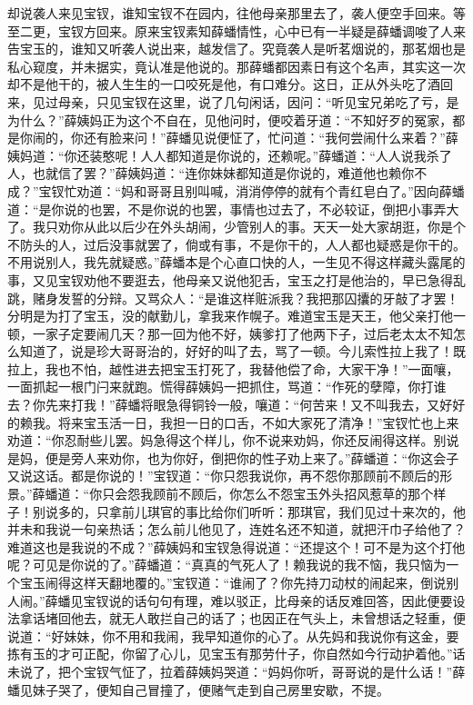 \documentclass[12pt,oneside]{book}
\begin{document}
却说袭人来见宝钗，谁知宝钗不在园内，往他母亲那里去了，袭人便空手回来。等至二更，宝钗方回来。原来宝钗素知薛蟠情性，心中已有一半疑是薛蟠调唆了人来告宝玉的，谁知又听袭人说出来，越发信了。究竟袭人是听茗烟说的，那茗烟也是私心窥度，并未据实，竟认准是他说的。那薛蟠都因素日有这个名声，其实这一次却不是他干的，被人生生的一口咬死是他，有口难分。这日，正从外头吃了酒回来，见过母亲，只见宝钗在这里，说了几句闲话，因问：“听见宝兄弟吃了亏，是为什么？”薛姨妈正为这个不自在，见他问时，便咬着牙道：“不知好歹的冤家，都是你闹的，你还有脸来问！”薛蟠见说便怔了，忙问道：“我何尝闹什么来着？”薛姨妈道：“你还装憨呢！人人都知道是你说的，还赖呢。”薛蟠道：“人人说我杀了人，也就信了罢？”薛姨妈道：“连你妹妹都知道是你说的，难道他也赖你不成？”宝钗忙劝道：“妈和哥哥且别叫喊，消消停停的就有个青红皂白了。”因向薛蟠道：“是你说的也罢，不是你说的也罢，事情也过去了，不必较证，倒把小事弄大了。我只劝你从此以后少在外头胡闹，少管别人的事。天天一处大家胡逛，你是个不防头的人，过后没事就罢了，倘或有事，不是你干的，人人都也疑惑是你干的。不用说别人，我先就疑惑。”薛蟠本是个心直口快的人，一生见不得这样藏头露尾的事，又见宝钗劝他不要逛去，他母亲又说他犯舌，宝玉之打是他治的，早已急得乱跳，赌身发誓的分辩。又骂众人：“是谁这样赃派我？我把那囚攮的牙敲了才罢！分明是为打了宝玉，没的献勤儿，拿我来作幌子。难道宝玉是天王，他父亲打他一顿，一家子定要闹几天？那一回为他不好，姨爹打了他两下子，过后老太太不知怎么知道了，说是珍大哥哥治的，好好的叫了去，骂了一顿。今儿索性拉上我了！既拉上，我也不怕，越性进去把宝玉打死了，我替他偿了命，大家干净！”一面嚷，一面抓起一根门闩来就跑。慌得薛姨妈一把抓住，骂道：“作死的孽障，你打谁去？你先来打我！”薛蟠将眼急得铜铃一般，嚷道：“何苦来！又不叫我去，又好好的赖我。将来宝玉活一日，我担一日的口舌，不如大家死了清净！”宝钗忙也上来劝道：“你忍耐些儿罢。妈急得这个样儿，你不说来劝妈，你还反闹得这样。别说是妈，便是旁人来劝你，也为你好，倒把你的性子劝上来了。”薛蟠道：“你这会子又说这话。都是你说的！”宝钗道：“你只怨我说你，再不怨你那顾前不顾后的形景。”薛蟠道：“你只会怨我顾前不顾后，你怎么不怨宝玉外头招风惹草的那个样子！别说多的，只拿前儿琪官的事比给你们听听：那琪官，我们见过十来次的，他并未和我说一句亲热话；怎么前儿他见了，连姓名还不知道，就把汗巾子给他了？难道这也是我说的不成？”薛姨妈和宝钗急得说道：“还提这个！可不是为这个打他呢？可见是你说的了。”薛蟠道：“真真的气死人了！赖我说的我不恼，我只恼为一个宝玉闹得这样天翻地覆的。”宝钗道：“谁闹了？你先持刀动杖的闹起来，倒说别人闹。”薛蟠见宝钗说的话句句有理，难以驳正，比母亲的话反难回答，因此便要设法拿话堵回他去，就无人敢拦自己的话了；也因正在气头上，未曾想话之轻重，便说道：“好妹妹，你不用和我闹，我早知道你的心了。从先妈和我说你有这金，要拣有玉的才可正配，你留了心儿，见宝玉有那劳什子，你自然如今行动护着他。”话未说了，把个宝钗气怔了，拉着薛姨妈哭道：“妈妈你听，哥哥说的是什么话！”薛蟠见妹子哭了，便知自己冒撞了，便赌气走到自己房里安歇，不提。
\end{document}
